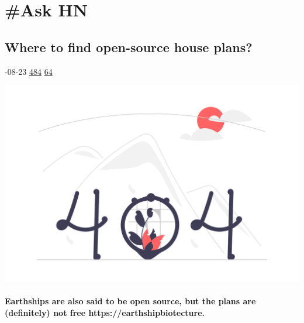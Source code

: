 \documentclass[10pt,a4paper]{article}
\begin{document}
\newpage
\section{\#Ask HN}

\begin{multicols*}{2}

\noindent\begin{minipage}{\linewidth}
\subsection{Where to find open-source house plans?}
\textsc{\footnotesize
{\scriptsize\faCalendar}-08-23 
{\scriptsize\faThumbsOUp}\space 
\href{}{484} 
{\scriptsize\faComments}\space 
\href{}{64} 
}
\par\medskip\noindent
\href{https://news.ycombinator.com/item?id=37234111\&utm\_source=hackernewsletter\&utm\_medium=email\&utm\_term=ask\_hn}{
    \includegraphics[width=0.99\linewidth]{notfound.png}
}
\end{minipage}
\paragraph{}
\textbf{Earthships are also said to be open source, but the plans are (definitely) not free
https://earthshipbiotecture.}

\end{multicols*}
\end{document}
